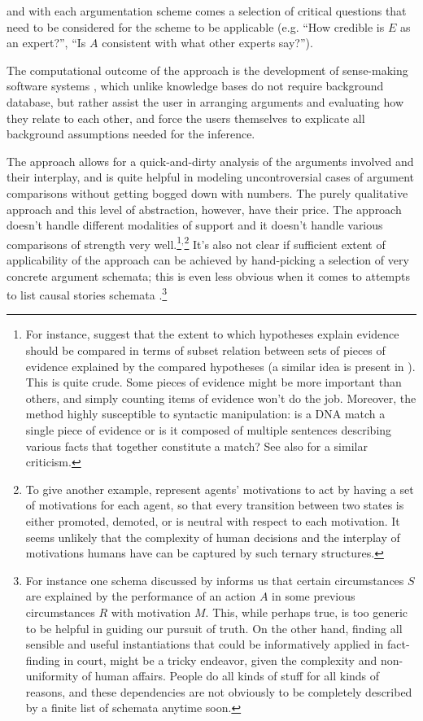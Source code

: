 \documentclass[10pt,leqno]{article}
\begin{document}
\noindent and with each argumentation scheme comes a selection of critical questions that need to be considered for the scheme to be applicable (e.g. ``How credible is $E$ as an expert?'', ``Is $A$ consistent with what other experts say?'').

The computational outcome of the approach is the development of sense-making software systems \citep{bex2007sense}, which unlike knowledge bases do not require background database, but rather assist the user in arranging arguments and evaluating how they relate to each other, and force the users themselves to explicate all background assumptions needed for the inference.


The approach allows for a quick-and-dirty analysis of the arguments involved  and their interplay, and is quite helpful in modeling uncontroversial cases of argument comparisons without getting bogged down with numbers. The purely qualitative approach and this level of abstraction, however, have their price. The approach doesn't handle different modalities of support \citep[140]{bex2007sense} and it doesn't handle various comparisons of strength  very well.\footnote{For instance, \citep[154]{bex2007sense} suggest that the extent to which hypotheses explain evidence should be compared   in terms of subset relation between sets of pieces of evidence explained by the compared hypotheses (a similar idea is present in \citep[16]{verheij2015arguments}). This is quite crude. Some pieces of evidence might be more important than others, and simply counting items of evidence won't do the job. Moreover, the method highly susceptible to syntactic manipulation: is a DNA match a single piece of evidence or is it composed of multiple sentences describing various facts that together constitute a match? See also \citep[414]{vlek2014building} for a similar criticism.}$^{,}$\footnote{To give another example, \citep[87]{bex2009did} represent agents' motivations  to act by having a set of motivations for each agent, so that every transition between two states is either promoted, demoted, or is neutral with respect to each motivation. It seems unlikely that  the complexity of human decisions and the interplay of motivations humans have can be captured by such ternary structures.}
It's also not clear if sufficient extent of applicability of the approach can be achieved by hand-picking a selection of very concrete argument schemata; this is even less obvious when it comes to attempts to list causal stories schemata \citep{bex2009did}.\footnote{For instance one schema discussed by \citep[82]{bex2009did} informs us that certain circumstances $S$ are explained by the performance of an action $A$ in some previous circumstances $R$ with motivation $M$. This, while perhaps true, is too generic to be helpful in guiding our pursuit of truth. On the other hand, finding all sensible and useful instantiations that could be informatively applied in fact-finding in court, might be a tricky endeavor, given the complexity and non-uniformity of human affairs. People do all kinds of stuff for all kinds of reasons, and these dependencies are not obviously to be completely described by a finite list of schemata anytime soon.}
\end{document}
